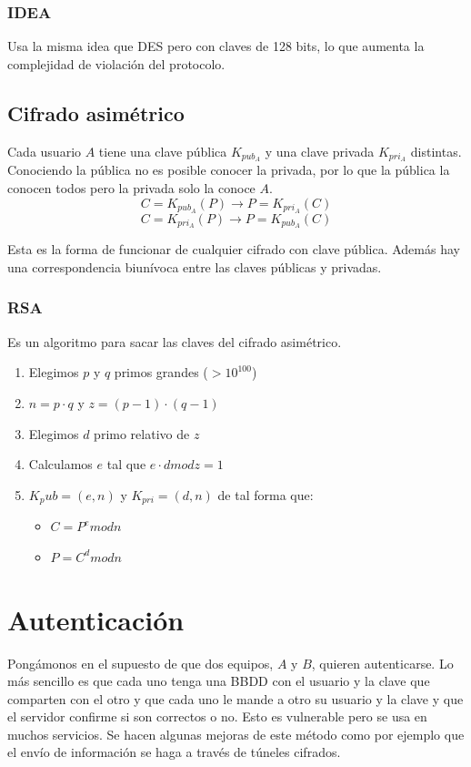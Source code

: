 \subsubsection{IDEA\@}
Usa la misma idea que DES pero con claves de 128 bits, lo que aumenta la complejidad de violación del protocolo. 

\subsection{Cifrado asimétrico}
Cada usuario $A$ tiene una clave pública $K_{pub_A}$ y una clave privada $K_{pri_A}$ distintas. Conociendo la pública no es posible conocer la privada, por lo que la pública la conocen todos pero la privada solo la conoce $A$. 
\begin{equation*}
    C = K_{pub_A}(P) \rightarrow P = K_{pri_A}(C)
\end{equation*}
\begin{equation*}
    C = K_{pri_A}(P) \rightarrow P = K_{pub_A}(C)
\end{equation*}

Esta es la forma de funcionar de cualquier cifrado con clave pública. Además hay una correspondencia biunívoca entre las claves públicas y privadas. 
\subsubsection{RSA\@}
\noindent
Es un algoritmo para sacar las claves del cifrado asimétrico. 
\begin{enumerate}
    
    \item Elegimos $p$ y $q$ primos grandes ($>10^{100}$)
    \item $n = p\cdot q$ y $z = (p-1)\cdot(q-1)$
    \item Elegimos $d$ primo relativo de $z$
    \item Calculamos $e$ tal que $e\cdot d mod z = 1$
    \item $K_pub = (e,n)$ y $K_{pri} = (d,n)$ de tal forma que:
        \begin{itemize}
            \item $C=P^e modn$
            \item $P=C^d modn$
        \end{itemize}
\end{enumerate}

\section{Autenticación}
Pongámonos en el supuesto de que dos equipos, $A$ y $B$, quieren autenticarse. Lo más sencillo es que cada uno tenga una BBDD con el usuario y la clave que comparten con el otro y que cada uno le mande a otro su usuario y la clave y que el servidor confirme si son correctos o no. Esto es vulnerable pero se usa en muchos servicios. Se hacen algunas mejoras de este método como por ejemplo que el envío de información se haga a través de túneles cifrados. 

